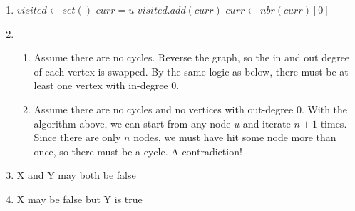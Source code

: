 \documentclass[11pt]{article}
\begin{document}
\begin{enumerate}
    \item 
    \begin{algorithmic}
        \State $visited \gets set()$
        \State $curr = u$
            \State $visited.add(curr)$
            \State $curr \gets nbr(curr)[0]$
        \EndWhile
    \end{algorithmic}
    \item 
    \begin{enumerate}
        \item Assume there are no cycles. Reverse the graph, so the in and out degree of each vertex is swapped. By the same logic as below, there must be at least one vertex with in-degree 0.
        \item Assume there are no cycles and no vertices with out-degree 0. With the algorithm above, we can start from any node $u$ and iterate $n + 1$ times. Since there are only $n$ nodes, we must have hit some node more than once, so there must be a cycle. A contradiction!
    \end{enumerate}
    \item X and Y may both be false
    \item X may be false but Y is true
\end{enumerate}
\end{document}
